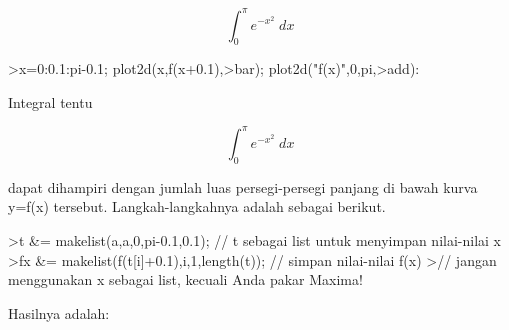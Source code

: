 \documentclass[12pt,arial,letterpaper]{book}
\begin{document}
\begin{eulercomment}
\begin{eulercomment}
\begin{eulercomment}
\begin{eulercomment}
\begin{eulercomment}
\begin{eulercomment}
\begin{eulercomment}
\begin{eulercomment}
\begin{eulercomment}
\begin{eulercomment}
\begin{eulercomment}
\begin{eulercomment}
\begin{eulercomment}
\begin{eulercomment}
\begin{eulercomment}
\begin{eulercomment}
\begin{eulercomment}
\begin{eulercomment}
\begin{eulercomment}
\begin{eulercomment}
\begin{eulercomment}
\begin{eulercomment}
\begin{eulercomment}
\end{eulercomment}
\begin{eulerformula}
\[
\int_{0}^{\pi}{e^ {- x^2 }\;dx}
\]
\end{eulerformula}
\begin{eulerprompt}
>x=0:0.1:pi-0.1; plot2d(x,f(x+0.1),>bar); plot2d("f(x)",0,pi,>add):
\end{eulerprompt}
\begin{eulercomment}
Integral tentu

\end{eulercomment}
\begin{eulerformula}
\[
\int_{0}^{\pi}{e^ {- x^2 }\;dx}
\]
\end{eulerformula}
\begin{eulercomment}
dapat dihampiri dengan jumlah luas persegi-persegi panjang di bawah
kurva y=f(x) tersebut. Langkah-langkahnya adalah sebagai berikut.
\end{eulercomment}
\begin{eulerprompt}
>t &= makelist(a,a,0,pi-0.1,0.1); // t sebagai list untuk menyimpan nilai-nilai x
>fx &= makelist(f(t[i]+0.1),i,1,length(t)); // simpan nilai-nilai f(x)
>// jangan menggunakan x sebagai list, kecuali Anda pakar Maxima!
\end{eulerprompt}
\begin{eulercomment}
Hasilnya adalah:


\end{eulercomment}
\end{eulercomment}
\end{eulercomment}
\end{eulercomment}
\end{eulercomment}
\end{eulercomment}
\end{eulercomment}
\end{eulercomment}
\end{eulercomment}
\end{eulercomment}
\end{eulercomment}
\end{eulercomment}
\end{eulercomment}
\end{eulercomment}
\end{eulercomment}
\end{eulercomment}
\end{eulercomment}
\end{eulercomment}
\end{eulercomment}
\end{eulercomment}
\end{eulercomment}
\end{eulercomment}
\end{eulercomment}
\end{document}
